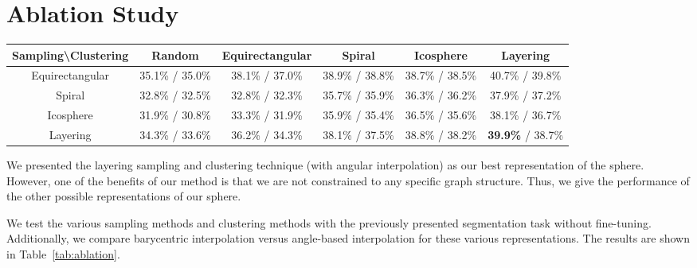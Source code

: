 \documentclass[10pt,twocolumn,letterpaper]{article}
\begin{document}
\section{Ablation Study}\label{sec:Ablation}

\begin{table*}[]
    \centering
    \begin{tabular}{|c|ccccc|}
        \hline
        Sampling\textbackslash Clustering & Random & Equirectangular & Spiral & Icosphere & Layering \\
        \hline
        Equirectangular & 35.1\% / 35.0\%  & 38.1\% / 37.0\% & 38.9\% / 38.8\% & 38.7\% / 38.5\% & 40.7\% / 39.8\%  \\
        Spiral & 32.8\% / 32.5\%  & 32.8\% / 32.3\% & 35.7\% / 35.9\% & 36.3\% / 36.2\% & 37.9\% / 37.2\% \\
        Icosphere &  31.9\% / 30.8\% & 33.3\% / 31.9\% & 35.9\% / 35.4\%  & 36.5\% / 35.6\% & 38.1\% / 36.7\% \\
        Layering &  34.3\% / 33.6\% & 36.2\% / 34.3\% & 38.1\% / 37.5\% & 38.8\% / 38.2\%  & \textbf{39.9\%} / 38.7\%  \\
        \hline
    \end{tabular}
    \caption{Ablation study comparing mIOU results for the various sampling, clustering, and interpolation approaches on the Stanford2D-3D-S segmentation task. Angle-based interpolation results are shown on the left. Barycentric results are shown on the right. Results for random clustering were averaged over multiple configurations.}
    \label{tab:ablation}
\end{table*}



We presented the layering sampling and clustering technique (with angular interpolation) as our best representation of the sphere. However, one of the benefits of our method is that we are not constrained to any specific graph structure. Thus, we give the performance of the other possible representations of our sphere. 

We test the various sampling methods and clustering methods with the previously presented segmentation task without fine-tuning. Additionally, we compare barycentric interpolation versus angle-based interpolation for these various representations. The results are shown in Table~\ref{tab:ablation}.
\end{document}
